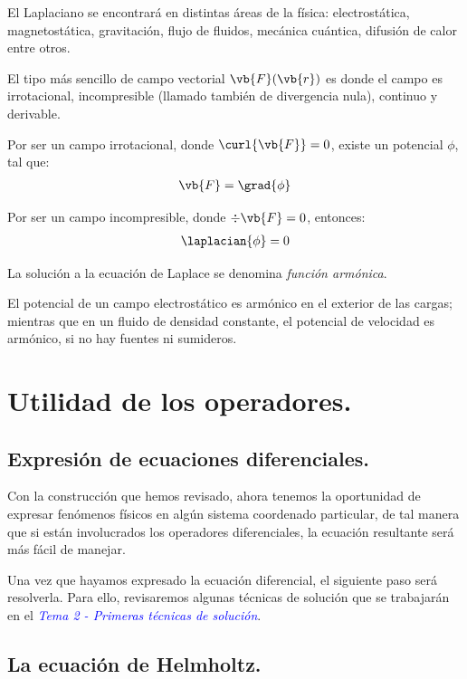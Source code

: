 El Laplaciano se encontrará en distintas áreas de la física: electrostática, magnetostática, gravitación, flujo de fluidos, mecánica cuántica, difusión de calor entre otros.
\par
El tipo más sencillo de campo vectorial $\vb{F}(\vb{r})$ es donde el campo es irrotacional, incompresible (llamado también de divergencia nula), continuo y derivable.
\par
Por ser un campo irrotacional, donde $\curl{\vb{F}} = 0$, existe un potencial $\phi$, tal que:
\begin{align*}
\vb{F} = \grad{\phi}
\end{align*}

Por ser un campo incompresible, donde $\div{\vb{F}} = 0$, entonces:
\begin{align*}
\laplacian{\phi} = 0
\end{align*}

La solución a la ecuación de Laplace se denomina \emph{función armónica}.
\par
El potencial de un campo electrostático es armónico en el exterior de las cargas; mientras que en un fluido de densidad constante, el potencial de velocidad es armónico, si no hay fuentes ni sumideros.

\section{Utilidad de los operadores.}

\subsection{Expresión de ecuaciones diferenciales.}

Con la construcción que hemos revisado, ahora tenemos la oportunidad de expresar fenómenos físicos en algún sistema coordenado particular, de tal manera que si están involucrados los operadores diferenciales, la ecuación resultante será más fácil de manejar.

Una vez que hayamos expresado la ecuación diferencial, el siguiente paso será resolverla. Para ello, revisaremos algunas técnicas de solución que se trabajarán en el \emph{\textcolor{blue}{Tema 2 - Primeras técnicas de solución}}.

\subsection{La ecuación de Helmholtz.}

